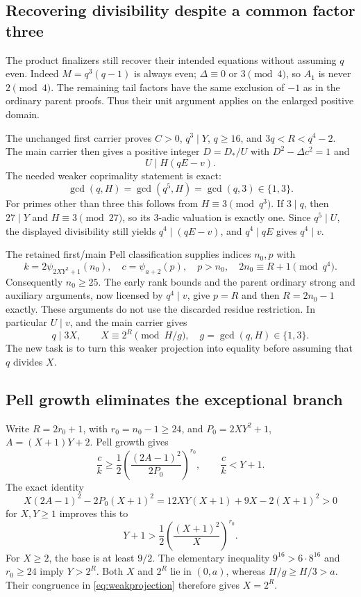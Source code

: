 \subsection{Recovering divisibility despite a common factor three}
The product finalizers still recover their intended equations without
assuming $q$ even. Indeed $M=q^3(q-1)$ is always even;
$\Delta\equiv0$ or $3\pmod4$, so $A_1$ is never $2\pmod4$.
The remaining tail factors have the same exclusion of $-1$ as in the
ordinary parent proofs. Thus their unit argument applies on the enlarged
positive domain.

The unchanged first carrier proves $C>0$, $q^3\mid Y$, $q\ge16$,
and $3q<R<q^4-2$. The main carrier then gives a positive integer
$D=D_*/U$ with $D^2-\Delta c^2=1$ and
\[
 U\mid H(qE-v).
\]
The needed weaker coprimality statement is exact:
\begin{equation}
 \gcd(q,H)=\gcd(q^5,H)=\gcd(q,3)\in\{1,3\}.\label{eq:gcd3}
\end{equation}
For primes other than three this follows from $H\equiv3\pmod{q^3}$.
If $3\mid q$, then $27\mid Y$ and $H\equiv3\pmod{27}$, so its
$3$-adic valuation is exactly one. Since $q^5\mid U$, the displayed
divisibility still yields $q^4\mid(qE-v)$, and $q^4\mid qE$ gives
$q^4\mid v$.

The retained first/main Pell classification supplies indices $n_0,p$ with
\[
 k=2\psi_{2XY^2+1}(n_0),\quad c=\psi_{a+2}(p),\quad p>n_0,
 \quad 2n_0\equiv R+1\pmod{q^4}.
\]
Consequently $n_0\ge25$. The early rank bounds and the parent ordinary
strong and auxiliary arguments, now licensed by $q^4\mid v$, give
$p=R$ and then $R=2n_0-1$ exactly. These arguments do not use the
discarded residue restriction. In particular $U\mid v$, and the main
carrier gives
\begin{equation}
 q\mid3X,\qquad X\equiv2^R\pmod{H/g},\quad
 g=\gcd(q,H)\in\{1,3\}.\label{eq:weakprojection}
\end{equation}
The new task is to turn this weaker projection into equality before
assuming that $q$ divides $X$.

\subsection{Pell growth eliminates the exceptional branch}
Write $R=2r_0+1$, with $r_0=n_0-1\ge24$, and $P_0=2XY^2+1$,
$A=(X+1)Y+2$. Pell growth gives
\[
 \frac ck\ge\frac12\left(\frac{(2A-1)^2}{2P_0}\right)^{r_0},
 \qquad\frac ck<Y+1.
\]
The exact identity
\[
 X(2A-1)^2-2P_0(X+1)^2
 =12XY(X+1)+9X-2(X+1)^2>0
\]
for $X,Y\ge1$ improves this to
\begin{equation}
 Y+1>\frac12\left(\frac{(X+1)^2}{X}\right)^{r_0}.\label{eq:growth}
\end{equation}
For $X\ge2$, the base is at least $9/2$. The elementary inequality
$9^{16}>6\cdot8^{16}$ and $r_0\ge24$ imply $Y>2^R$.
Both $X$ and $2^R$ lie in $(0,a)$, whereas $H/g\ge H/3>a$.
Their congruence in \eqref{eq:weakprojection} therefore gives $X=2^R$.

